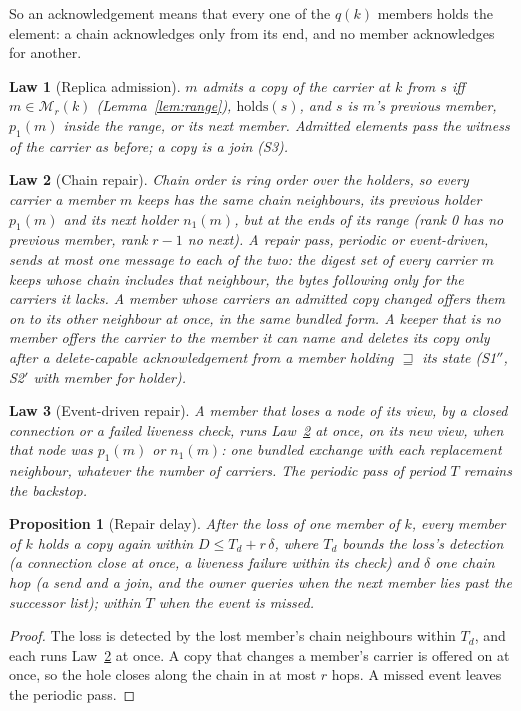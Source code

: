 \documentclass[journal]{IEEEtran}
\newtheorem{law}{Law}
\newtheorem{proposition}{Proposition}
\newcommand{\Mem}{\mathcal{M}}
\begin{document}
So an acknowledgement means that every one of the $q(k)$ members holds the element: a chain
acknowledges only from its end, and no member acknowledges for another.

\begin{law}[Replica admission]\label{law:admitcopy}
$m$ admits a copy of the carrier at $k$ from $s$ iff $m\in\Mem_r(k)$
(Lemma~\ref{lem:range}), $\mathrm{holds}(s)$, and $s$ is $m$'s previous member, $p_1(m)$ inside
the range, or its next member.  Admitted elements pass the witness of the carrier as before; a
copy is a join (S3).
\end{law}

\begin{law}[Chain repair]\label{law:memberrepair}
Chain order is ring order over the holders, so every carrier a member $m$ keeps has the same
chain neighbours, its previous holder $p_1(m)$ and its next holder $n_1(m)$, but at the ends of
its range (rank 0 has no previous member, rank $r-1$ no next).  A repair pass, periodic or
event-driven, sends at most one message to each of the two: the digest set of every carrier $m$
keeps whose chain includes that neighbour, the bytes following only for the carriers it lacks.
A member whose carriers an admitted copy changed offers them on to its other neighbour at once,
in the same bundled form.  A keeper that is no member offers the carrier to the member it can
name and deletes its copy only after a delete-capable acknowledgement from a member holding
$\sqsupseteq$ its state (S1$''$, S2$'$ with member for holder).
\end{law}

\begin{law}[Event-driven repair]\label{law:eventrepair}
A member that loses a node of its view, by a closed connection or a failed liveness check, runs
Law~\ref{law:memberrepair} at once, on its new view, when that node was $p_1(m)$ or $n_1(m)$: one
bundled exchange with each replacement neighbour, whatever the number of carriers.  The
periodic pass of period $T$ remains the backstop.
\end{law}

\begin{proposition}[Repair delay]\label{prop:delay}
After the loss of one member of $k$, every member of $k$ holds a copy again within
$D\le T_d+r\,\delta$, where $T_d$ bounds the loss's detection (a connection close at once, a
liveness failure within its check) and $\delta$ one chain hop (a send and a join, and the owner
queries when the next member lies past the successor list); within $T$ when the event is
missed.
\end{proposition}
\begin{proof}
The loss is detected by the lost member's chain neighbours within $T_d$, and each runs
Law~\ref{law:memberrepair} at once.  A copy that changes a member's carrier is offered on at
once, so the hole closes along the chain in at most $r$ hops.  A missed event leaves the
periodic pass.
\end{proof}
\end{document}
